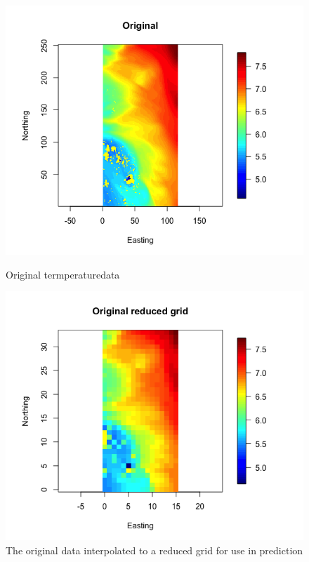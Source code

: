 \begin{figure}[!htb]
   \begin{minipage}{0.475\textwidth}
     \centering
     \includegraphics[width=1.25\linewidth]{figurer/original.png}
        \caption{Original termperaturedata}
        \label{fig:data_original}
   \end{minipage}
   \begin {minipage}{0.44\textwidth}
     \centering
     \includegraphics[width=1.3\linewidth]{figurer/original_reduced.png}
     \caption{The original data interpolated to a reduced grid for use in prediction}
	 \label{fig:data_original_reduced}
   \end{minipage}
\end{figure}

